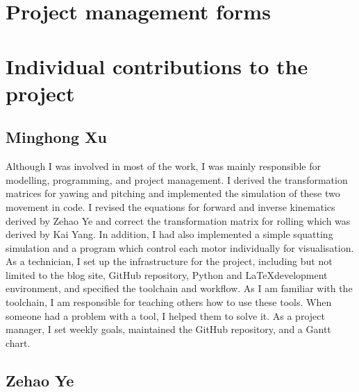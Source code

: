 \newpage
\appendix
\appendixpage
\addappheadtotoc


\chapter{Project management forms}









\chapter{Individual contributions to the project}

\section{Minghong Xu}

Although I was involved in most of the work, I was mainly responsible for modelling, programming, and project management. I derived the transformation matrices for yawing and pitching and implemented the simulation of these two movement in code. I revised the equations for forward and inverse kinematics derived by Zehao Ye and correct the transformation matrix for rolling which was derived by Kai Yang. In addition, I had also implemented a simple squatting simulation and a program which control each motor individually for visualisation. As a technician, I set up the infrastructure for the project, including but not limited to the blog site, GitHub repository, Python and \LaTeX development environment, and specified the toolchain and workflow. As I am familiar with the toolchain, I am responsible for teaching others how to use these tools. When someone had a problem with a tool, I helped them to solve it. As a project manager, I set weekly goals, maintained the GitHub repository, and a Gantt chart.

\section{Zehao Ye}

